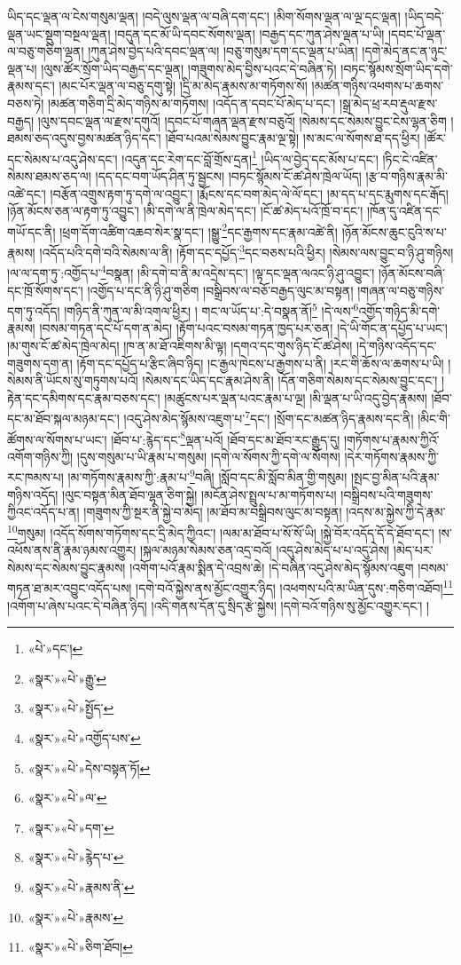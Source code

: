 ཡིད་དང་ལྡན་ལ་ངེས་གསུམ་ལྡན། །བདེ་ལུས་ལྡན་ལ་བཞི་དག་དང་། །མིག་སོགས་ལྡན་ལ་ལྔ་དང་ལྡན། །ཡིད་བདེ་ལྡན་ཡང་སྡུག་བསྔལ་ལྡན། །བདུན་དང་མོ་ཡི་དབང་སོགས་ལྡན། །བརྒྱད་དང་ཀུན་ཤེས་ལྡན་པ་ཡི། །དབང་པོ་ལྡན་ལ་བཅུ་གཅིག་ལྡན། །ཀུན་ཤེས་བྱེད་པའི་དབང་ལྡན་ལ། །བཅུ་གསུམ་དག་དང་ལྡན་པ་ཡིན། །དགེ་མེད་ནང་ན་ཉུང་ལྡན་པ། །ལུས་ཚོར་སྲོག་ཡིད་བརྒྱད་དང་ལྡན། །གཟུགས་མེད་བྱིས་པའང་དེ་བཞིན་ཏེ། །བཏང་སྙོམས་སྲོག་ཡིད་དགེ་རྣམས་དང་། །མང་པོར་ལྡན་ལ་བཅུ་དགུ་སྟེ། །དྲི་མ་མེད་རྣམས་མ་གཏོགས་སོ། །མཚན་གཉིས་འཕགས་པ་ཆགས་བཅས་ཏེ། །མཚན་གཅིག་དྲི་མེད་གཉིས་མ་གཏོགས། །འདོད་ན་དབང་པོ་མེད་པ་དང་། །སྒྲ་མེད་ཕྲ་རབ་རྡུལ་རྫས་བརྒྱད། །ལུས་དབང་ལྡན་ལ་རྫས་དགུའོ། །དབང་པོ་གཞན་ལྡན་རྫས་བཅུའོ། །སེམས་དང་སེམས་བྱུང་ངེས་ལྷན་ཅིག །ཐམས་ཅད་འདུས་བྱས་མཚན་ཉིད་དང་། །ཐོབ་པའམ་སེམས་བྱུང་རྣམ་ལྔ་སྟེ། །ས་མང་ལ་སོགས་ཐ་དད་ཕྱིར། །ཚོར་དང་སེམས་པ་འདུ་ཤེས་དང་། །འདུན་དང་རེག་དང་བློ་གྲོས་དྲན།\footnote{«པེ་»དང་།} །ཡིད་ལ་བྱེད་དང་མོས་པ་དང་། །ཏིང་ངེ་འཛིན་སེམས་ཐམས་ཅད་ལ། །དད་དང་བག་ཡོད་ཤིན་ཏུ་སྦྱངས། །བཏང་སྙོམས་ངོ་ཚ་ཤེས་ཁྲེལ་ཡོད། །རྩ་བ་གཉིས་རྣམ་མི་འཚེ་དང་། །བརྩོན་འགྲུས་རྟག་ཏུ་དགེ་ལ་འབྱུང་། །རྨོངས་དང་བག་མེད་ལེ་ལོ་དང་། །མ་དད་པ་དང་རྨུགས་དང་རྒོད། །ཉོན་མོངས་ཅན་ལ་རྟག་ཏུ་འབྱུང་། །མི་དགེ་ལ་ནི་ཁྲེལ་མེད་དང་། །ངོ་ཚ་མེད་པའོ་ཁྲོ་བ་དང་། །ཁོན་དུ་འཛིན་དང་གཡོ་དང་ནི། །ཕྲག་དོག་འཚིག་འཆབ་སེར་སྣ་དང་། །སྒྱུ་\footnote{«སྣར་»«པེ་»རྒྱུ་}དང་རྒྱགས་དང་རྣམ་འཚེ་ནི། །ཉོན་མོངས་ཆུང་ངུའི་ས་པ་རྣམས། །འདོད་པའི་དགེ་བའི་སེམས་ལ་ནི། །རྟོག་དང་དཔྱོད་\footnote{«སྣར་»«པེ་»སྤྱོད་}དང་བཅས་པའི་ཕྱིར། །སེམས་ལས་བྱུང་བ་ཉི་ཤུ་གཉིས། །ལ་ལ་དག་ཏུ་:འགྱོད་པ་\footnote{«སྣར་»«པེ་»འགྱོད་པས་}བསྣན། །མི་དགེ་བ་ནི་མ་འདྲེས་དང་། །ལྟ་དང་ལྡན་ལའང་ཉི་ཤུ་འབྱུང་། །ཉོན་མོངས་བཞི་དང་ཁྲོ་སོགས་དང་། །འགྱོད་པ་དང་ནི་ཉི་ཤུ་གཅིག །བསྒྲིབས་ལ་བཅོ་བརྒྱད་ལུང་མ་བསྟན། །གཞན་ལ་བཅུ་གཉིས་དག་ཏུ་འདོད། །གཉིད་ནི་ཀུན་ལ་མི་འགལ་ཕྱིར། །
གང་ལ་ཡོད་པ་:དེ་བསྣན་ནོ།\footnote{«སྣར་»«པེ་»དེས་བསྟན་ཏོ།} །དེ་ལས་\footnote{«སྣར་»«པེ་»ལ་}འགྱོད་གཉིད་མི་དགེ་རྣམས། །བསམ་གཏན་དང་པོ་དག་ན་མེད། །རྟོག་པའང་བསམ་གཏན་ཁྱད་པར་ཅན། །དེ་ཡི་གོང་ན་དཔྱོད་པ་ཡང་། །མ་གུས་ངོ་ཚ་མེད་ཁྲེལ་མེད། །ཁ་ན་མ་ཐོ་འཇིགས་མི་ལྟ། །དགའ་དང་གུས་ཉིད་ངོ་ཚ་ཤེས། །དེ་གཉིས་འདོད་དང་གཟུགས་དག་ན། །རྟོག་དང་དཔྱོད་པ་རྩིང་ཞིབ་ཉིད། །ང་རྒྱལ་ཁེངས་པ་རྒྱགས་པ་ནི། །རང་གི་ཆོས་ལ་ཆགས་པ་ཡི། །སེམས་ནི་ཡོངས་སུ་གཏུགས་པའོ། །སེམས་དང་ཡིད་དང་རྣམ་ཤེས་ནི། །དོན་གཅིག་སེམས་དང་སེམས་བྱུང་དང་། །རྟེན་དང་དམིགས་དང་རྣམ་བཅས་དང་། །མཚུངས་པར་ལྡན་པའང་རྣམ་པ་ལྔ། །མི་ལྡན་པ་ཡི་འདུ་བྱེད་རྣམས། །ཐོབ་དང་མ་ཐོབ་སྐལ་མཉམ་དང་། །འདུ་ཤེས་མེད་སྙོམས་འཇུག་པ་\footnote{«སྣར་»«པེ་»དག་}དང་། །སྲོག་དང་མཚན་ཉིད་རྣམས་དང་ནི། །མིང་གི་ཚོགས་ལ་སོགས་པ་ཡང་། །ཐོབ་པ་:རྙེད་དང་\footnote{«སྣར་»«པེ་»རྙེད་པ་}ལྡན་པའོ། །ཐོབ་དང་མ་ཐོབ་རང་རྒྱུད་དུ། །གཏོགས་པ་རྣམས་ཀྱིའོ་འགོག་གཉིས་ཀྱི། །དུས་གསུམ་པ་ཡི་རྣམ་པ་གསུམ། །དགེ་ལ་སོགས་ཀྱི་དགེ་ལ་སོགས། །དེར་གཏོགས་རྣམས་ཀྱི་རང་ཁམས་པ། །མ་གཏོགས་རྣམས་ཀྱི་:རྣམ་པ་\footnote{«སྣར་»«པེ་»རྣམས་ནི་}བཞི། །སློབ་དང་མི་སློབ་མིན་གྱི་གསུམ། །སྤང་བྱ་མིན་པའི་རྣམ་གཉིས་འདོད། །ལུང་བསྟན་མིན་ཐོབ་ལྷན་ཅིག་སྐྱེ། །མངོན་ཤེས་སྤྲུལ་པ་མ་གཏོགས་པ། །བསྒྲིབས་པའི་གཟུགས་ཀྱིའང་འདོད་པ་ན། །གཟུགས་ཀྱི་སྔར་ནི་སྐྱེ་བ་མེད། །མ་ཐོབ་མ་བསྒྲིབས་ལུང་མ་བསྟན། །འདས་མ་སྐྱེས་ཀྱི་དེ་རྣམ་\footnote{«སྣར་»«པེ་»རྣམས་}གསུམ། །འདོད་སོགས་གཏོགས་དང་དྲི་མེད་ཀྱིའང་། །ལམ་མ་ཐོབ་པ་སོ་སོ་ཡི། །སྐྱེ་བོར་འདོད་དོ་དེ་ཐོབ་དང་། །ས་འཕོས་ནས་ནི་རྣམ་ཉམས་འགྱུར། །སྐལ་མཉམ་སེམས་ཅན་འདྲ་བའོ། །འདུ་ཤེས་མེད་པ་པ་འདུ་ཤེས། །མེད་པར་སེམས་དང་སེམས་བྱུང་རྣམས། །འགོག་པའོ་རྣམ་སྨིན་དེ་འབྲས་ཆེ། །དེ་བཞིན་འདུ་ཤེས་མེད་སྙོམས་འཇུག །བསམ་གཏན་ཐ་མར་འབྱུང་འདོད་པས། །དགེ་བའོ་སྐྱེས་ནས་མྱོང་འགྱུར་ཉིད། །འཕགས་པའི་མ་ཡིན་དུས་:གཅིག་འཐོབ།\footnote{«སྣར་»«པེ་»ཅིག་ཐོབ།} །འགོག་པ་ཞེས་པའང་དེ་བཞིན་ཉིད། །འདི་གནས་དོན་དུ་སྲིད་རྩེ་སྐྱེས། །དགེ་བའོ་གཉིས་སུ་མྱོང་འགྱུར་དང་། །
